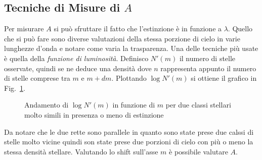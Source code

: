 \subsection{Tecniche di Misure di $A$}
Per misurare $A$ si pu\`o sfruttare il fatto che l'estinzione \`e in funzione a $\lambda$. Quello che si pu\`o fare sono diverse valutazioni della stessa porzione di cielo in varie lunghezze d'onda e notare come varia la trasparenza. Una delle tecniche pi\`u usate \`e quella della \emph{funzione di luminosit\`a}. Definisco $N'(m)$ il numero di stelle osservate, quindi se ne deduce una densit\`a
dove $n$ rappresenta appunto il numero di stelle comprese tra $m$ e $m+dm$. Plottando $\log N'(m)$ si ottiene il grafico in Fig.~\ref{LUM:FUN}.
\begin{figure}
		\centering
		\caption{Andamento di $\log N'(m)$ in funzione di $m$ per due classi stellari molto simili in presenza o meno di estinzione}
		\label{LUM:FUN}
\end{figure}
Da notare che le due rette sono parallele in quanto sono state prese due calssi di stelle molto vicine quindi son state prese due porzioni di cielo con pi\`u o meno la stessa densit\`a stellare. Valutando lo shift sull'asse $m$ \`e possibile valutare $A$.

